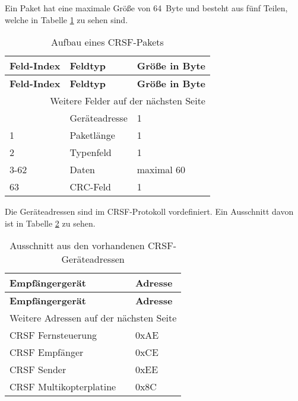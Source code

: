 Ein Paket hat eine maximale Größe von 64~Byte und besteht aus fünf Teilen, welche in Tabelle \ref{table:crsfPaket} zu sehen sind. \cite{cleanflightCrsf}

\begin{longtable}[c]{|l|l|l|}
    \caption{Aufbau eines CRSF-Pakets \cite{cleanflightCrsf}}
    \label{table:crsfPaket}\\
    \hline
    \textbf{Feld-Index} & \textbf{Feldtyp} & \textbf{Größe in Byte}\\
    \hline
    \hline
    \endfirsthead

    \hline
    \textbf{Feld-Index} & \textbf{Feldtyp} & \textbf{Größe in Byte}\\
    \hline
    \hline
    \endhead

    \hline
    \multicolumn{3}{|r|}{Weitere Felder auf der nächsten Seite}\\
    \hline
    \endfoot

    \hline
    \endlastfoot
    0 & Geräteadresse & 1\\
    \hline
    1 & Paketlänge & 1\\
    \hline
    2 & Typenfeld & 1\\
    \hline
    3-62 & Daten & maximal 60\\
    \hline
    63 & CRC-Feld & 1\\
\end{longtable}

Die Geräteadressen sind im CRSF-Protokoll vordefiniert. Ein Ausschnitt davon ist in Tabelle \ref{table:crsfAdressen} zu sehen.

\begin{longtable}[c]{|l|l|}
    \caption{Ausschnitt aus den vorhandenen CRSF-Geräteadressen \cite{cleanflightCrsfP}}
    \label{table:crsfAdressen}\\
    \hline
    \textbf{Empfängergerät} & \textbf{Adresse}\\
    \hline
    \hline
    \endfirsthead

    \hline
    \textbf{Empfängergerät} & \textbf{Adresse}\\
    \hline
    \hline
    \endhead

    \hline
    \multicolumn{2}{|r|}{Weitere Adressen auf der nächsten Seite}\\
    \hline
    \endfoot

    \hline
    \endlastfoot
    
    CRSF Fernsteuerung & 0xAE \\
    \hline
    CRSF Empfänger & 0xCE \\
    \hline
    CRSF Sender & 0xEE \\
    \hline
    CRSF Multikopterplatine & 0x8C \\
\end{longtable}

